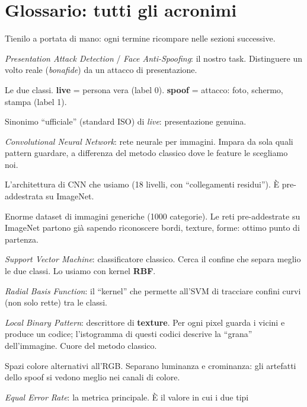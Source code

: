 \documentclass[11pt,a4paper]{article}
\newcommand{\acr}[1]{\textbf{#1}}
\newcommand{\say}[1]{``#1''}
\begin{document}
\section{Glossario: tutti gli acronimi}
Tienilo a portata di mano: ogni termine ricompare nelle sezioni successive.

\begin{description}[style=nextline,leftmargin=1.2cm]
  \item[PAD / FAS] \textit{Presentation Attack Detection} / \textit{Face Anti-Spoofing}: il
    nostro task. Distinguere un volto reale (\emph{bonafide}) da un attacco di presentazione.
  \item[live / spoof] Le due classi. \textbf{live} = persona vera (label 0).
    \textbf{spoof} = attacco: foto, schermo, stampa (label 1).
  \item[bonafide] Sinonimo \say{ufficiale} (standard ISO) di \emph{live}: presentazione genuina.
  \item[CNN] \textit{Convolutional Neural Network}: rete neurale per immagini. Impara da sola
    quali pattern guardare, a differenza del metodo classico dove le feature le scegliamo noi.
  \item[ResNet-18] L'architettura di CNN che usiamo (18 livelli, con \say{collegamenti residui}).
    \`E pre-addestrata su ImageNet.
  \item[ImageNet] Enorme dataset di immagini generiche (1000 categorie). Le reti pre-addestrate
    su ImageNet partono gi\`a sapendo riconoscere bordi, texture, forme: ottimo punto di partenza.
  \item[SVM] \textit{Support Vector Machine}: classificatore classico. Cerca il confine che
    separa meglio le due classi. Lo usiamo con kernel \acr{RBF}.
  \item[RBF] \textit{Radial Basis Function}: il \say{kernel} che permette all'SVM di tracciare
    confini curvi (non solo rette) tra le classi.
  \item[LBP] \textit{Local Binary Pattern}: descrittore di \textbf{texture}. Per ogni pixel
    guarda i vicini e produce un codice; l'istogramma di questi codici descrive la \say{grana}
    dell'immagine. Cuore del metodo classico.
  \item[YCbCr / HSV] Spazi colore alternativi all'RGB. Separano luminanza e crominanza:
    gli artefatti dello spoof si vedono meglio nei canali di colore.
  \item[EER] \textit{Equal Error Rate}: la metrica principale. \`E il valore in cui i due tipi

\end{description}
\end{document}
